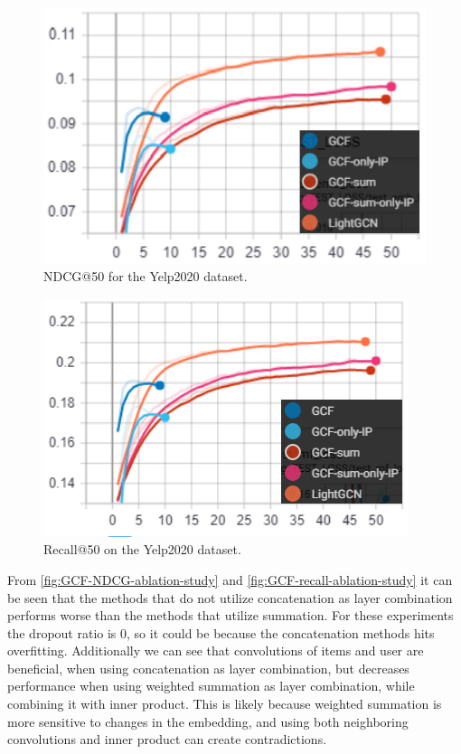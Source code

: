\begin{figure}[h!]
    \includegraphics[width=\linewidth]{figures/GCF-NDCG-Yelp-ablation.png}
    \caption{NDCG@50 for the Yelp2020 dataset.}
    \label{fig:GCF-NDCG-ablation-study}
\end{figure}

\begin{figure}[h!]
    \includegraphics[width=\linewidth]{figures/GCF-recall-Yelp-ablation.png}
    \caption{Recall@50 on the Yelp2020 dataset.}
    \label{fig:GCF-recall-ablation-study}
\end{figure}
From \autoref{fig:GCF-NDCG-ablation-study} and \autoref{fig:GCF-recall-ablation-study} it can be seen that the methods that do not utilize concatenation as layer combination performs worse than the methods that utilize summation.
For these experiments the dropout ratio is 0, so it could be because the concatenation methods hits overfitting.
Additionally we can see that convolutions of items and user are beneficial, when using concatenation as layer combination, but decreases performance when using weighted summation as layer combination, while combining it with inner product.
This is likely because weighted summation is more sensitive to changes in the embedding, and using both neighboring convolutions and inner product can create contradictions.